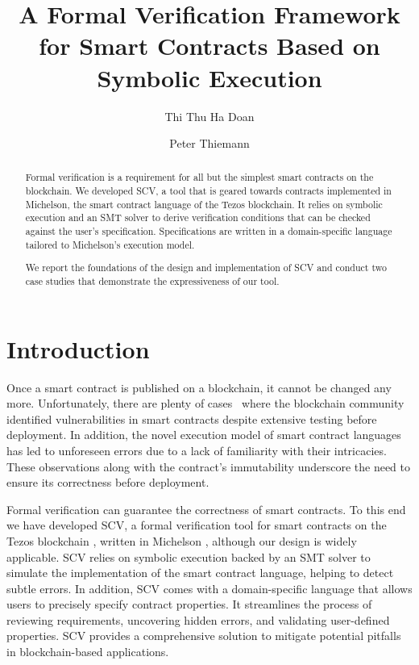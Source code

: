 \documentclass[a4paper,USenglish,cleveref, autoref, thm-restate]{lipics-v2021}
\title{A Formal Verification Framework for Smart Contracts Based on Symbolic Execution} %
\author{Thi Thu Ha Doan}{University of Freiburg,
  Germany}{doanha@informatik.uni-freiburg.de}{https://orcid.org/0000−0001−7524−4497}{Supported
by the Tezos Foundation, grant COOC }%
\author{Peter Thiemann}{University of Freiburg, Germany}{thiemann@informatik.uni-freiburg.de}{https://orcid.org/0000−0002−9000−1239}{}
\begin{document}
\maketitle

\begin{abstract}
Formal verification is a requirement for all but the simplest smart
contracts on the blockchain. We developed SCV, a tool that is geared towards contracts
implemented in Michelson, the smart contract language of the Tezos
blockchain. It relies on symbolic execution and an SMT solver to
derive verification conditions that can be checked against the user's
specification. Specifications are written in a domain-specific
language tailored to Michelson's execution model.

We report the foundations of the design and implementation of SCV and
conduct two case studies that demonstrate the expressiveness of our tool.
\end{abstract}

\section{Introduction}
\label{sec:introduction}

Once a smart contract is published on a blockchain, it cannot be
changed any more. Unfortunately, there are plenty of
cases~\cite{dao,wallethack} where the blockchain 
community identified vulnerabilities in smart contracts despite
extensive testing before deployment.
In addition, the novel execution model of smart contract
languages has led to unforeseen errors due to a lack of familiarity
with their intricacies. These observations along with the contract's
immutability underscore the need to ensure its correctness before deployment. 

Formal verification can guarantee the correctness of smart contracts.
To this end we have developed SCV, a formal
verification tool for smart contracts on the Tezos blockchain \cite{tezos-whitepaper}, written in
Michelson \cite{michelson}, although our design is widely applicable. SCV relies on
symbolic execution backed by an SMT solver to simulate the
implementation of the smart contract language, helping to detect 
subtle errors. In addition, SCV comes with a domain-specific language that
allows users to precisely specify contract properties.
It streamlines the process of reviewing requirements,
uncovering hidden errors, and validating user-defined properties.
SCV provides a comprehensive solution to
mitigate potential pitfalls in blockchain-based applications. 
\end{document}
